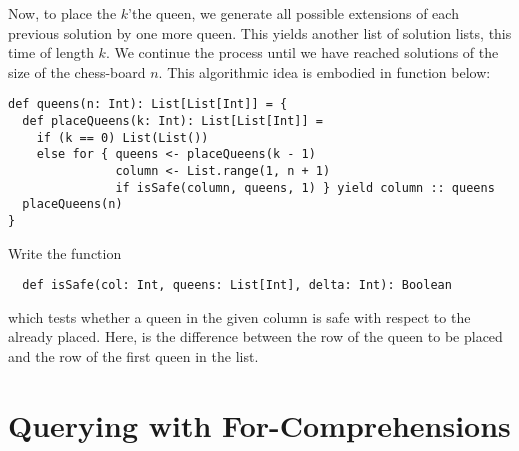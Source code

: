 Now, to place the $k$'the queen, we generate all possible extensions
of each previous solution by one more queen. This yields another list
of solution lists, this time of length $k$. We continue the process
until we have reached solutions of the size of the chess-board $n$.
This algorithmic idea is embodied in function  below:
\begin{lstlisting}
def queens(n: Int): List[List[Int]] = {
  def placeQueens(k: Int): List[List[Int]] =
    if (k == 0) List(List())
    else for { queens <- placeQueens(k - 1)
               column <- List.range(1, n + 1)
               if isSafe(column, queens, 1) } yield column :: queens
  placeQueens(n)
}
\end{lstlisting}

\begin{exercise} Write the function
\begin{lstlisting}
  def isSafe(col: Int, queens: List[Int], delta: Int): Boolean
\end{lstlisting}
which tests whether a queen in the given column \verb@col@ is safe with 
respect to the \verb@queens@ already placed. Here, \verb@delta@ is the difference between the row of the queen to be
placed and the row of the first queen in the list.
\end{exercise}

\section{Querying with For-Comprehensions}


